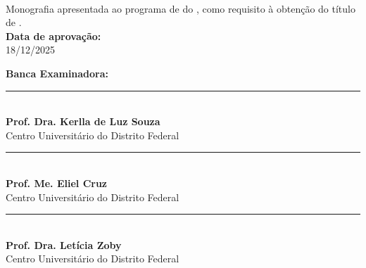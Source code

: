 %
%

\makeatletter
\begin{folhadeaprovacao}
	
	\thispagestyle{empty}%
	
	\begin{center}
		
		\small\textbf{\expandafter\uppercase\expandafter{\imprimirnomeautor}}\\
		\vspace*{3.0 cm}%
		\normalsize\textbf{\expandafter\uppercase\expandafter{\imprimirtitulotb}}
		
	\end{center}
	
	\vspace*{0.35 cm}%
	\large%
	\hfill%
	\begin{minipage}{10 cm}%
		\begin{small} %
			\setlength{\baselineskip}{\baselineskip}
			
			
			{Monografia apresentada ao programa de {\textbf{\imprimirprograma}}
				do {\textbf{\imprimirinstituicao}},
				como requisito à obtenção do título de
				{\textbf{\imprimirgrau}}.}\\
			
			{\textbf{Data de aprovação:}\\
				18/12/2025
			}
			\vspace*{1.0 cm}
		
			{\textbf{Banca Examinadora:}\\
				
				\vspace*{1.0 cm}
				
				\rule{\linewidth}{.1 mm}\\
				{\textbf{Prof. Dra. Kerlla de Luz Souza}\\
					Centro Universitário do Distrito Federal
				}
			
				\vspace*{1.0 cm}

				\rule{\linewidth}{.1 mm}\\
				{\textbf{Prof. Me. Eliel Cruz}\\
					Centro Universitário do Distrito Federal
				}
			
				\vspace*{1.0 cm}
				
				\rule{\linewidth}{.1 mm}\\
				{\textbf{Prof. Dra. Letícia Zoby}\\
					Centro Universitário do Distrito Federal}
			}
			

\end{small}
\end{minipage}
\end{folhadeaprovacao}
